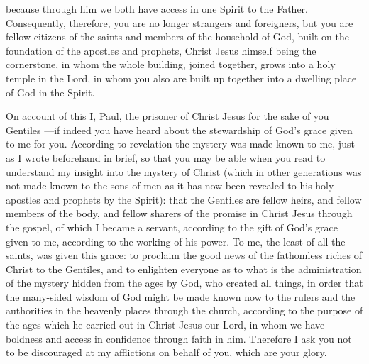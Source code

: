 \begin{biblechapter}
\verse because through him we both have access in one Spirit to the Father.
\verse Consequently, therefore, you are no longer strangers and foreigners, but you are fellow citizens of the saints and members of the household of God,
\verse built on the foundation of the apostles and prophets, Christ Jesus himself being the cornerstone,
\verse in whom the whole building, joined together, grows into a holy temple in the Lord,
\verse in whom you also are built up together into a dwelling place of God in the Spirit.
\end{biblechapter}

\begin{biblechapter} %
 On account of this I, Paul, the prisoner of Christ Jesus for the sake of you Gentiles
\verse —if indeed you have heard about the stewardship of God’s grace given to me for you.
\verse According to revelation the mystery was made known to me, just as I wrote beforehand in brief,
\verse so that you may be able when you read to understand my insight into the mystery of Christ
\verse (which in other generations was not made known to the sons of men as it has now been revealed to his holy apostles and prophets by the Spirit):
\verse that the Gentiles are fellow heirs, and fellow members of the body, and fellow sharers of the promise in Christ Jesus through the gospel,
\verse of which I became a servant, according to the gift of God’s grace given to me, according to the working of his power.
\verse To me, the least of all the saints, was given this grace: to proclaim the good news of the fathomless riches of Christ to the Gentiles,
\verse and to enlighten everyone as to what is the administration of the mystery hidden from the ages by God, who created all things,
\verse in order that the many-sided wisdom of God might be made known now to the rulers and the authorities in the heavenly places through the church,
\verse according to the purpose of the ages which he carried out in Christ Jesus our Lord,
\verse in whom we have boldness and access in confidence through faith in him.
\verse Therefore I ask you not to be discouraged at my afflictions on behalf of you, which are your glory.

\end{biblechapter}
